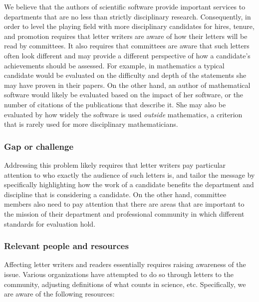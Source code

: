 We believe that the authors of scientific software provide important
services to departments that are no less than strictly disciplinary
research. Consequently, in order to level the playing field with more
disciplinary candidates for hires, tenure, and promotion requires that
letter writers are aware of how their letters will be read by
committees. It also requires that committees are aware that such
letters often look different and may provide a different perspective
of how a candidate's achievements should be assessed. For example, in
mathematics a typical candidate would be evaluated on the difficulty
and depth of the statements she may have proven in their papers. On
the other hand, an author of mathematical software would likely be
evaluated based on the impact of her software, or the number of citations of
the publications that describe it. She may also be evaluated by how
widely the software is used \textit{outside} mathematics, a criterion
that is rarely used for more disciplinary mathematicians.

\subsubsection{Gap or challenge}

Addressing this problem likely requires that letter writers pay
particular attention to who exactly the audience of such letters is,
and tailor the message by specifically highlighting how the work of a
candidate benefits the department and discipline that is considering a
candidate. On the other hand, committee members also need to pay
attention that there are areas that are important to the mission of
their department and professional community in which different
standards for evaluation hold.


\subsubsection{Relevant people and resources}

Affecting letter writers and readers essentially requires raising
awareness of the issue. Various organizations have attempted to do so
through letters to the community, adjusting definitions of what counts
in science, etc. Specifically, we are aware of the following
resources:

